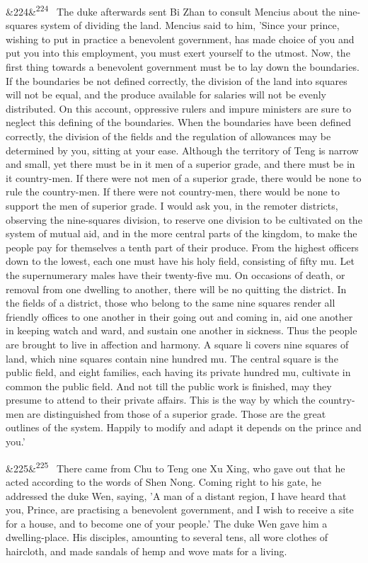 \documentclass[12pt]{article}
\newcommand{\para}[1][]{\par\noindent\ifx&#1&\else\textsuperscript{\footnotesize #1}~\fi}
\begin{document}
\para[224] The duke afterwards sent Bi Zhan to consult Mencius about the nine-squares system of dividing the land. Mencius said to him, 'Since your prince, wishing to put in practice a benevolent government, has made choice of you and put you into this employment, you must exert yourself to the utmost. Now, the first thing towards a benevolent government must be to lay down the boundaries. If the boundaries be not defined correctly, the division of the land into squares will not be equal, and the produce available for salaries will not be evenly distributed. On this account, oppressive rulers and impure ministers are sure to neglect this defining of the boundaries. When the boundaries have been defined correctly, the division of the fields and the regulation of allowances may be determined by you, sitting at your ease. Although the territory of Teng is narrow and small, yet there must be in it men of a superior grade, and there must be in it country-men. If there were not men of a superior grade, there would be none to rule the country-men. If there were not country-men, there would be none to support the men of superior grade. I would ask you, in the remoter districts, observing the nine-squares division, to reserve one division to be cultivated on the system of mutual aid, and in the more central parts of the kingdom, to make the people pay for themselves a tenth part of their produce. From the highest officers down to the lowest, each one must have his holy field, consisting of fifty mu. Let the supernumerary males have their twenty-five mu. On occasions of death, or removal from one dwelling to another, there will be no quitting the district. In the fields of a district, those who belong to the same nine squares render all friendly offices to one another in their going out and coming in, aid one another in keeping watch and ward, and sustain one another in sickness. Thus the people are brought to live in affection and harmony. A square li covers nine squares of land, which nine squares contain nine hundred mu. The central square is the public field, and eight families, each having its private hundred mu, cultivate in common the public field. And not till the public work is finished, may they presume to attend to their private affairs. This is the way by which the country-men are distinguished from those of a superior grade. Those are the great outlines of the system. Happily to modify and adapt it depends on the prince and you.'

\para[225] There came from Chu to Teng one Xu Xing, who gave out that he acted according to the words of Shen Nong. Coming right to his gate, he addressed the duke Wen, saying, 'A man of a distant region, I have heard that you, Prince, are practising a benevolent government, and I wish to receive a site for a house, and to become one of your people.' The duke Wen gave him a dwelling-place. His disciples, amounting to several tens, all wore clothes of haircloth, and made sandals of hemp and wove mats for a living.
\end{document}
